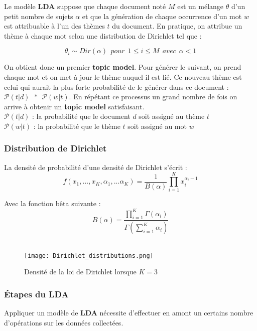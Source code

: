 \documentclass[a4paper,french,12pt]{article}
\begin{document}
Le modèle \textbf{LDA} suppose que chaque document noté $M$ est un mélange $\theta$ d'un petit nombre de sujets $\alpha$ et que la génération de chaque occurrence d'un mot $w$ est attribuable à l'un des thèmes $t$ du document. En pratique, on attribue un thème à chaque mot selon une distribution de Dirichlet tel que :

$$\theta_{i} \sim Dir(\alpha) \: \: pour \: \: 1 \leq i \leq M \: \: avec \: \: \alpha < 1$$

On obtient donc un premier \textbf{topic model}. Pour générer le suivant, on prend chaque mot et on met à jour le thème auquel il est lié. Ce nouveau thème est celui qui aurait la plus forte probabilité de le générer dans ce document : $\mathcal{P}(t | d) \: \: * \: \: \mathcal{P}(w | t)$. En répétant ce processus un grand nombre de fois on arrive à obtenir un \textbf{topic model} satisfaisant.\\

$\mathcal{P}(t | d)$ : la probabilité que le document $d$ soit assigné au thème $t$\\

$\mathcal{P}(w | t)$ : la probabilité que le thème $t$ soit assigné au mot $w$

\subsubsection{Distribution de Dirichlet}

La densité de probabilité d'une densité de Dirichlet s'écrit :
$$f(x_1,...,x_K,\alpha_1,...\alpha_K) = \frac{1}{B(\alpha)} \prod_{i = 1}^K x_i^{\alpha_{i}-1}$$

Avec la fonction bêta suivante : $$B(\alpha) = \frac{\prod_{i = 1}^K \Gamma(\alpha_i)}{\Gamma(\sum_{i = 1}^K \alpha_i)}$$\\

\begin{figure}[!h]
    \centering
    \texttt{[image: Dirichlet\_distributions.png]}
    \caption{Densité de la loi de Dirichlet lorsque $K=3$}
\end{figure}

\subsubsection{Étapes du LDA}

Appliquer un modèle de \textbf{LDA} nécessite d'effectuer en amont un certains nombre d'opérations sur les données collectées.\\
\end{document}
